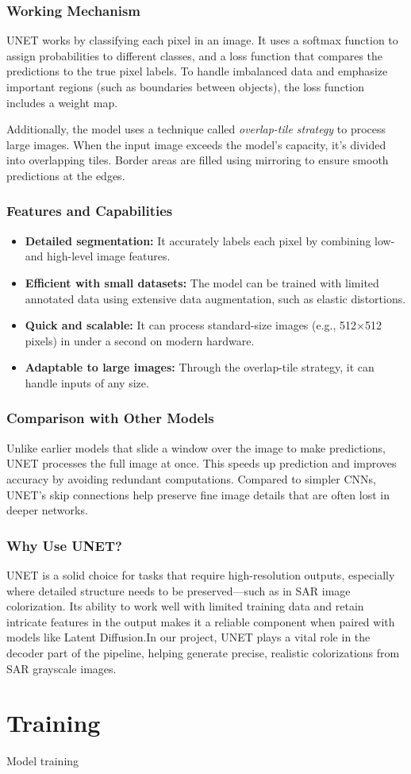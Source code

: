 \subsubsection{Working Mechanism}
UNET works by classifying each pixel in an image. It uses a softmax function \cite{ronneberger2015unetconvolutionalnetworksbiomedical} to assign probabilities to different classes, and a loss function that compares the predictions to the true pixel labels. To handle imbalanced data and emphasize important regions (such as boundaries between objects), the loss function includes a weight map.

Additionally, the model uses a technique called \textit{overlap-tile strategy} to process large images. When the input image exceeds the model's capacity, it's divided into overlapping tiles. Border areas are filled using mirroring to ensure smooth predictions at the edges.

\subsubsection{Features and Capabilities}
\begin{itemize}
    \item \textbf{Detailed segmentation:} It accurately labels each pixel by combining low- and high-level image features.
    \item \textbf{Efficient with small datasets:} The model can be trained with limited annotated data using extensive data augmentation, such as elastic distortions.
    \item \textbf{Quick and scalable:} It can process standard-size images (e.g., 512×512 pixels) in under a second on modern hardware.
    \item \textbf{Adaptable to large images:} Through the overlap-tile strategy, it can handle inputs of any size.
\end{itemize}

\subsubsection{Comparison with Other Models}
Unlike earlier models that slide a window over the image to make predictions, UNET processes the full image at once. This speeds up prediction and improves accuracy by avoiding redundant computations. Compared to simpler CNNs, UNET’s skip connections help preserve fine image details that are often lost in deeper networks.

\subsubsection{Why Use UNET?}
UNET is a solid choice for tasks that require high-resolution outputs, especially where detailed structure needs to be preserved—such as in SAR image colorization. Its ability to work well with limited training data and retain intricate features in the output makes it a reliable component when paired with models like Latent Diffusion.In our project, UNET plays a vital role in the decoder part of the pipeline, helping generate precise, realistic colorizations from SAR grayscale images.


\section{Training}

Model training